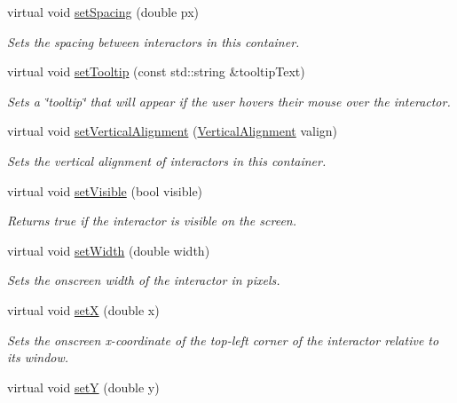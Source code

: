 \begin{DoxyCompactItemize}
virtual void \mbox{\hyperlink{classsgl_1_1GContainer_a0f85f7b45435b302ae701cb00574bf52}{set\+Spacing}} (double px)
\begin{DoxyCompactList}\small\item\em Sets the spacing between interactors in this container. \end{DoxyCompactList}\item 
virtual void \mbox{\hyperlink{classsgl_1_1GInteractor_a039e0e49beaecc275efce02d416acea8}{set\+Tooltip}} (const std\+::string \&tooltip\+Text)
\begin{DoxyCompactList}\small\item\em Sets a \char`\"{}tooltip\char`\"{} that will appear if the user hovers their mouse over the interactor. \end{DoxyCompactList}\item 
virtual void \mbox{\hyperlink{classsgl_1_1GContainer_a465537d012ad40704a011ad927ce435d}{set\+Vertical\+Alignment}} (\mbox{\hyperlink{namespacesgl_a9c2ed22cfbd21f13df24ea193b310aee}{Vertical\+Alignment}} valign)
\begin{DoxyCompactList}\small\item\em Sets the vertical alignment of interactors in this container. \end{DoxyCompactList}\item 
virtual void \mbox{\hyperlink{classsgl_1_1GInteractor_a18e44e30b31525a243960ca3928125aa}{set\+Visible}} (bool visible)
\begin{DoxyCompactList}\small\item\em Returns true if the interactor is visible on the screen. \end{DoxyCompactList}\item 
virtual void \mbox{\hyperlink{classsgl_1_1GInteractor_aa3f3fba4cb131baa8696ba01e3bceca1}{set\+Width}} (double width)
\begin{DoxyCompactList}\small\item\em Sets the onscreen width of the interactor in pixels. \end{DoxyCompactList}\item 
virtual void \mbox{\hyperlink{classsgl_1_1GInteractor_a9c18fcc579333bf9653d13ad2b372e39}{setX}} (double x)
\begin{DoxyCompactList}\small\item\em Sets the onscreen x-\/coordinate of the top-\/left corner of the interactor relative to its window. \end{DoxyCompactList}\item 
virtual void \mbox{\hyperlink{classsgl_1_1GInteractor_a7d57e2a5c35d27feb58fd498a3cf82b9}{setY}} (double y)

\end{DoxyCompactItemize}
